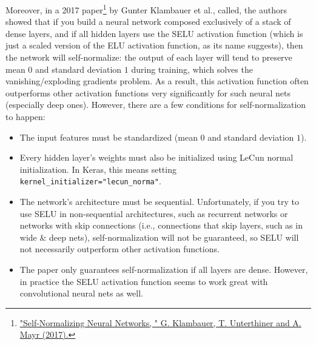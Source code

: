 Moreover, in a 2017 paper\footnote{\href{https://homl.info/selu}{"Self-Normalizing Neural Networks, " G. Klambauer, T. Unterthiner and A. Mayr (2017).}} by Gunter Klambauer et al., called, the authors showed that if you build a neural network composed exclusively of a stack of dense layers, and if all hidden layers use the SELU activation function (which is just a scaled version of the ELU activation function, as its name suggests), then the network will self-normalize: the output of each layer will tend to preserve mean $0$ and standard deviation $1$ during training, which solves the vanishing/exploding gradients problem. As a result, this activation function often outperforms other activation functions very significantly for such neural nets (especially deep ones). However, there are a few conditions for self-normalization to happen:
\begin{itemize}
\item The input features must be standardized (mean $0$ and standard deviation $1$).
\item Every hidden layer's weights must also be initialized using LeCun normal initialization. In Keras, this means setting \lstinline+kernel_initializer="lecun_norma"+.
\item The network's architecture must be sequential. Unfortunately, if you try to use SELU in non-sequential architectures, such as recurrent networks or networks with skip connections (i.e., connections that skip layers, such as in wide \& deep nets), self-normalization will not be guaranteed, so SELU will not necessarily outperform other activation functions.
\item The paper only guarantees self-normalization if all layers are dense. However, in practice the SELU activation function seems to work great with convolutional neural nets as well.
\end{itemize}

